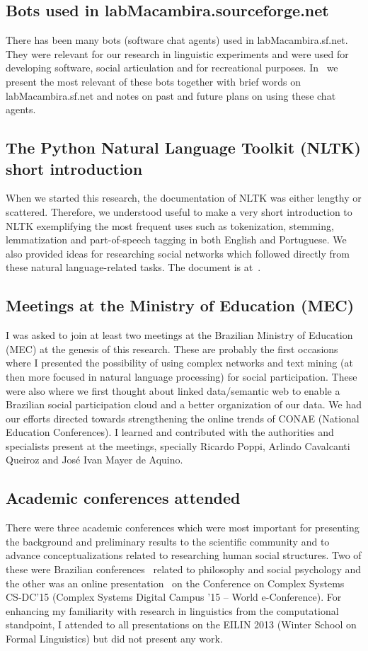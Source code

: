 \begin{apendicesenv}
\subsection{Bots used in labMacambira.sourceforge.net}
There has been many bots (software chat agents) used in labMacambira.sf.net.
They were relevant for our research in linguistic experiments and were used
for developing software, social articulation and for recreational purposes.
In~\cite{trabBots} we present the most relevant of these bots together with
brief words on labMacambira.sf.net and notes on past and future plans on using
these chat agents.

\subsection{The Python Natural Language Toolkit (NLTK) short introduction}
When we started this research, the documentation of NLTK was either lengthy or
scattered.
Therefore, we understood useful to make a very short introduction to NLTK
exemplifying the most frequent uses such as tokenization, stemming, lemmatization and
part-of-speech tagging in both English and Portuguese.
We also provided ideas for researching social networks which followed directly from
these natural language-related tasks.
The document is at~\cite{trabNLTK}.

\subsection{Meetings at the Ministry of Education (MEC)}
I was asked to join at least two meetings at the Brazilian Ministry of Education (MEC)
at the genesis of this research.
These are probably the first occasions where I presented the possibility of using
complex networks and text mining (at then more focused in natural language processing)
for social participation.
These were also where we first thought about linked data/semantic web to enable a
Brazilian social participation cloud and a better organization of our data.
We had our efforts directed towards strengthening the online trends of CONAE (National Education Conferences).
I learned and contributed with the authorities and specialists present at the meetings,
specially Ricardo Poppi, Arlindo Cavalcanti Queiroz and José Ivan Mayer de Aquino.

\subsection{Academic conferences attended}
There were three academic conferences
which were most important for presenting the background and preliminary results to the scientific community
and to advance conceptualizations related to researching human social structures.
Two of these were Brazilian conferences~\cite{50uni,IICri} related to philosophy and social psychology
and the other was an online presentation~\cite{ccs15} on the Conference on Complex Systems CS-DC'15
(Complex Systems Digital Campus ’15 – World e-Conference).
For enhancing my familiarity with research in linguistics from the computational standpoint,
I attended to all presentations on the EILIN 2013 (Winter School on Formal Linguistics)
but did not present any work.


\end{apendicesenv}
